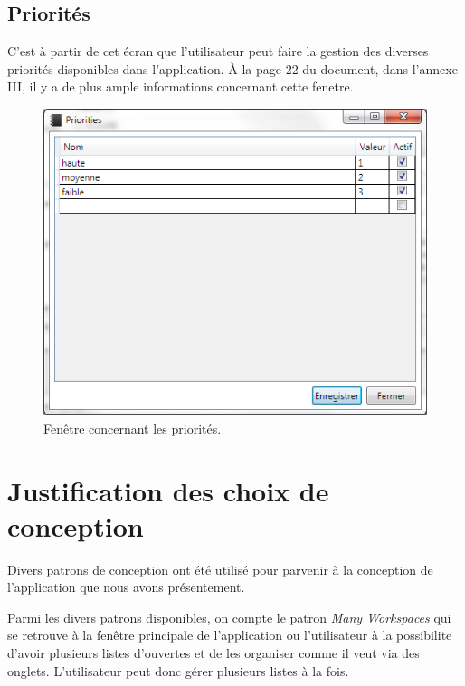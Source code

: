 \documentclass[letterpaper, oneside, 12pt, these, creativecommons]{thETS}
\begin{document}
\newpage

\subsection{Priorités}

C'est à partir de cet écran que l'utilisateur peut faire la gestion des diverses priorités disponibles dans l'application. À la page 22 du document, dans l'annexe III, il y a de plus ample informations concernant cette fenetre.

\begin{figure}[H!]
	\centering
	\includegraphics[width=1\textwidth]{fenetre_priorite.png}
	\caption{Fenêtre concernant les priorités.}
\end{figure}

\newpage

\section{Justification des choix de conception}

Divers patrons de conception ont été utilisé pour parvenir à la conception de l'application que nous avons présentement. 

Parmi les divers patrons disponibles, on compte le patron \emph{Many Workspaces} qui se retrouve à la fenêtre principale de l'application ou l'utilisateur à la possibilite d'avoir plusieurs listes d'ouvertes et de les organiser comme il veut via des onglets. L'utilisateur peut donc gérer plusieurs listes à la fois. 
\end{document}

